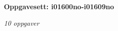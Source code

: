 \centerline{\bf Oppgavesett: i01600no-i01609no}
\vskip 10pt
\centerline{\it 10 oppgaver}\vskip 10pt
\vskip 10pt
